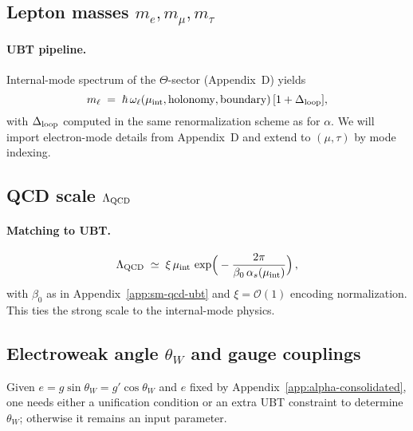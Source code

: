 \subsection{Lepton masses $m_e,m_\mu,m_\tau$}
\paragraph{UBT pipeline.} Internal-mode spectrum of the $\Theta$-sector (Appendix~D) yields
\begin{equation}
m_\ell \;=\; \hbar\, \omega_{\ell}(\mu_{\rm int},\text{holonomy},\text{boundary})\,[1+\Delta_{\rm loop}],
\end{equation}
with $\Delta_{\rm loop}$ computed in the same renormalization scheme as for $\alpha$.
We will import electron-mode details from Appendix~D and extend to $(\mu,\tau)$ by mode indexing.

\subsection{QCD scale $\Lambda_{\rm QCD}$}
\paragraph{Matching to UBT.}
\begin{equation}
\Lambda_{\rm QCD} \;\simeq\; \xi\, \mu_{\rm int}\, \exp\!\Big(-\frac{2\pi}{\beta_0\,\alpha_s(\mu_{\rm int})}\Big)\,,
\end{equation}
with $\beta_0$ as in Appendix~\ref{app:sm-qcd-ubt} and $\xi=\mathcal{O}(1)$ encoding normalization. This ties the strong scale to the internal-mode physics.

\subsection{Electroweak angle $\theta_W$ and gauge couplings}
Given $e=g\sin\theta_W=g'\cos\theta_W$ and $e$ fixed by Appendix~\ref{app:alpha-consolidated}, one needs either a unification condition or an extra UBT constraint to determine $\theta_W$; otherwise it remains an input parameter.

